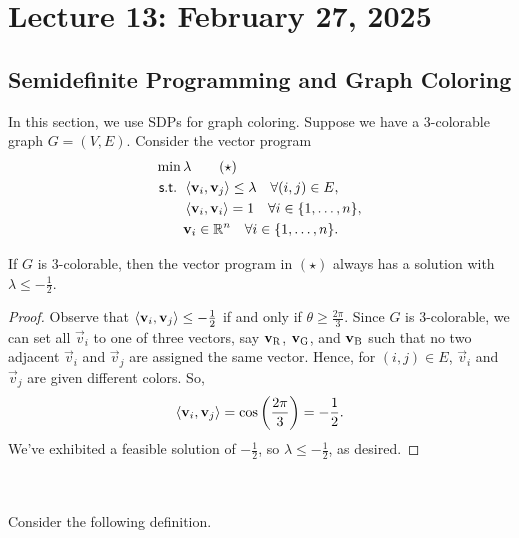 \pagebreak

\section{Lecture 13: February 27, 2025}

    \subsection{Semidefinite Programming and Graph Coloring}

        In this section, we use SDPs for graph coloring. Suppose we have a \(3\)-colorable graph \(G=(V,E)\). Consider the vector program
        \begin{align*}
            \min\,&\lambda \tag{\(\star\)}\\
            \textsf{s.t. }&\iprod{\vec{v}_i}{\vec{v}_j}\leq\lambda\quad \forall (i,j)\in E, \\
            &\iprod{\vec{v}_i}{\vec{v}_i}=1 \quad \forall i\in\{1,\ldots,n\}, \\
            &\vec{v}_i\in\mathbb{R}^n \quad \forall i\in\{1,\ldots,n\}.
        \end{align*}
        \begin{lemma*}
            If \(G\) is \(3\)-colorable, then the vector program in \((\star)\) always has a solution with \(\lambda\leq-\frac{1}{2}\). 
            \begin{proof}
                Observe that \(\iprod{\vec{v}_i}{\vec{v}_j}\leq-\frac{1}{2}\) if and only if \(\theta\geq\frac{2\pi}{3}\). Since \(G\) is \(3\)-colorable, we can set all \(\vec{v}_i\) to one of three vectors, say \(\vec{v}_\textsc{R}\), \(\vec{v}_\textsc{G}\), and \(\vec{v}_\textsc{B}\) such that no two adjacent \(\vec{v}_i\) and \(\vec{v}_j\) are assigned the same vector. Hence, for \((i,j)\in E\), \(\vec{v}_i\) and \(\vec{v}_j\) are given different colors. So,
                \begin{equation*}
                    \iprod{\vec{v}_i}{\vec{v}_j}=\cos\left(\frac{2\pi}{3}\right)=-\frac{1}{2}.
                \end{equation*}
                We've exhibited a feasible solution of \(-\frac{1}{2}\), so \(\lambda\leq -\frac{1}{2}\), as desired.
            \end{proof}
        \end{lemma*}
        \vphantom
        \\
        \\
        Consider the following definition.
